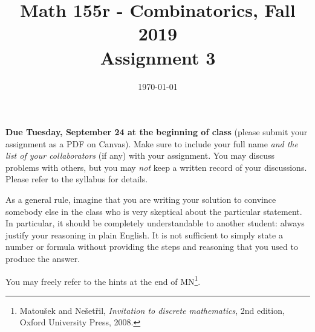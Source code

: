 \documentclass{amsart}
\title[Math 155r, Fall 2019: assignment 3]{Math 155r - Combinatorics, Fall 2019 \\ Assignment 3}
\date{\today}
\theoremstyle{definition}
\begin{document}

\vspace*{-10em}
\maketitle

\textbf{Due Tuesday, September 24 at the beginning of class} (please submit your assignment as a PDF on Canvas). Make sure to include your full name \emph{and the list of your collaborators} (if any) with your assignment. You may discuss problems with others, but you may \emph{not} keep a written record of your discussions. Please refer to the syllabus for details.

As a general rule, imagine that you are writing your solution to convince somebody else in the class who is very skeptical about the particular statement. In particular, it should be completely understandable to another student: always justify your reasoning in plain English. It is not sufficient to simply state a number or formula without providing the steps and reasoning that you used to produce the answer.

You may freely refer to the hints at the end of MN\footnote{Matoušek and Nešetřil, \emph{Invitation to discrete mathematics}, 2nd edition, Oxford University Press, 2008.}.
\end{document}
